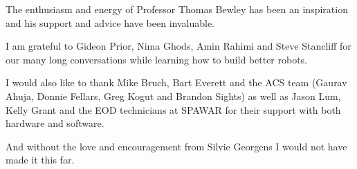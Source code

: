 \begin{frontmatter}
\tableofcontents
\listoffigures  %
\listoftables   %



\begin{acknowledgements}
The enthusiasm and energy of Professor Thomas Bewley has been an inspiration and his support and advice have been invaluable.

I am grateful to Gideon Prior, Nima Ghods, Amin Rahimi and Steve Stancliff for our many long conversations while learning how to build better robots.

I would also like to thank Mike Bruch, Bart Everett and the ACS team (Gaurav Ahuja, Donnie Fellars, Greg Kogut and Brandon Sights) as well as Jason Lum, Kelly Grant and the EOD technicians at SPAWAR for their support with both hardware and software.

And without the love and encouragement from Silvie Georgens I would not have made it this far.
\end{acknowledgements}




\end{frontmatter}
